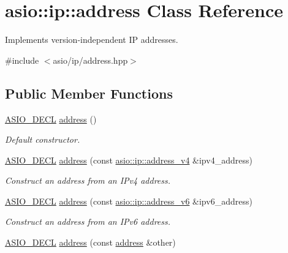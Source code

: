 \hypertarget{classasio_1_1ip_1_1address}{}\section{asio\+:\+:ip\+:\+:address Class Reference}
\label{classasio_1_1ip_1_1address}


Implements version-\/independent I\+P addresses.  




{\ttfamily \#include $<$asio/ip/address.\+hpp$>$}

\subsection*{Public Member Functions}
\begin{DoxyCompactItemize}
\item 
\hyperlink{config_8hpp_ab54d01ea04afeb9a8b39cfac467656b7}{A\+S\+I\+O\+\_\+\+D\+E\+C\+L} \hyperlink{classasio_1_1ip_1_1address_af8a9f7caf9889878c132530ef394b2f2}{address} ()
\begin{DoxyCompactList}\small\item\em Default constructor. \end{DoxyCompactList}\item 
\hyperlink{config_8hpp_ab54d01ea04afeb9a8b39cfac467656b7}{A\+S\+I\+O\+\_\+\+D\+E\+C\+L} \hyperlink{classasio_1_1ip_1_1address_a2893b925b25fdabe32b33eed35668945}{address} (const \hyperlink{classasio_1_1ip_1_1address__v4}{asio\+::ip\+::address\+\_\+v4} \&ipv4\+\_\+address)
\begin{DoxyCompactList}\small\item\em Construct an address from an I\+Pv4 address. \end{DoxyCompactList}\item 
\hyperlink{config_8hpp_ab54d01ea04afeb9a8b39cfac467656b7}{A\+S\+I\+O\+\_\+\+D\+E\+C\+L} \hyperlink{classasio_1_1ip_1_1address_a1fb3143c77eea569d63fb44911c713c8}{address} (const \hyperlink{classasio_1_1ip_1_1address__v6}{asio\+::ip\+::address\+\_\+v6} \&ipv6\+\_\+address)
\begin{DoxyCompactList}\small\item\em Construct an address from an I\+Pv6 address. \end{DoxyCompactList}\item 
\hyperlink{config_8hpp_ab54d01ea04afeb9a8b39cfac467656b7}{A\+S\+I\+O\+\_\+\+D\+E\+C\+L} \hyperlink{classasio_1_1ip_1_1address_a4210e20ec0d7883ae021f32f82e1c8bc}{address} (const \hyperlink{classasio_1_1ip_1_1address}{address} \&other)

\end{DoxyCompactItemize}
